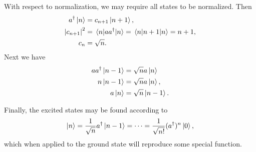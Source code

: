 With respect to normalization, we may require all states to be normalized. Then
\begin{align*}
	a^{\dagger}\ket{n}      &= c_{n + 1}\ket{n + 1}, \\
	\abs{c_{n + 1}}^{2} &= \expval{aa^{\dagger}}{n} = \expval{n + 1}{n} = n + 1, \\
	c_{n}               &= \sqrt{n}.
\end{align*}
Next we have
\begin{align*}
	aa^{\dagger}\ket{n - 1} &= \sqrt{n}a\ket{n} \\
	n\ket{n - 1}        &= \sqrt{n}a\ket{n}, \\
	a\ket{n}            &= \sqrt{n}\ket{n - 1}.
\end{align*}

Finally, the excited states may be found according to
\begin{align*}
	\ket{n} = \frac{1}{\sqrt{n}}a^{\dagger}\ket{n - 1} = \dots = \frac{1}{\sqrt{n!}}(a^{\dagger})^{n}\ket{0},
\end{align*}
which when applied to the ground state will reproduce some special function.